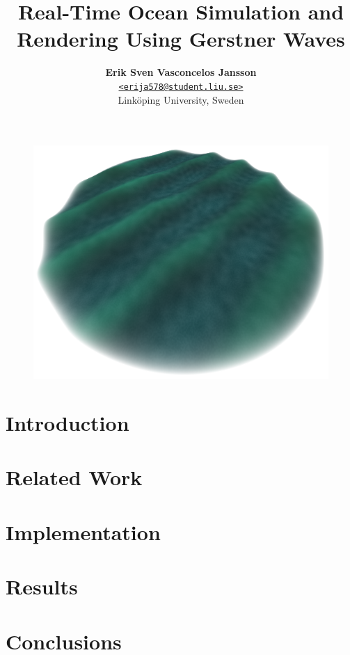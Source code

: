\documentclass[a4paper, twocolumn]{article}
\title{\vspace{-1.5em}\textbf{Real-Time Ocean Simulation and \\
                              Rendering Using Gerstner Waves}}
\author{{\textbf{Erik Sven Vasconcelos Jansson}} \\
        {\href{mailto:erija578@student.liu.se}
        {\texttt{<erija578@student.liu.se>}}} \\
        {Linköping University, Sweden}}
\begin{document}
    \maketitle

    \begin{figure}[h] \includegraphics[width=\linewidth]{figures/gerstner.png} \end{figure}
    \begin{abstract}  \end{abstract} \newpage
    \section{Introduction} \label{sec:introduction} 
    \section{Related Work} \label{sec:related_work} 
    \section{Implementation} \label{sec:implementation} 
    \section{Results} \label{sec:results} 
    \section{Conclusions} \label{sec:conclusions} 
\end{document}
